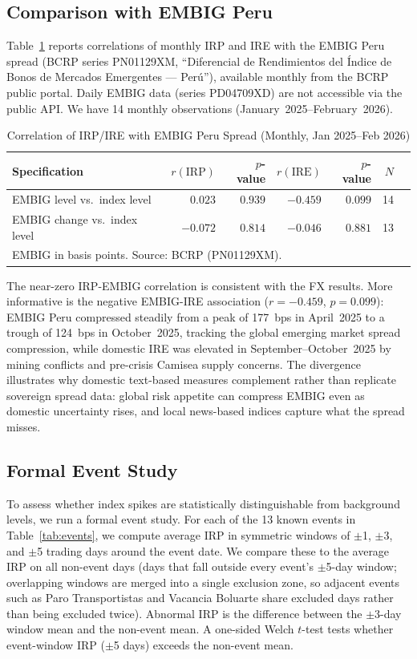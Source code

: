 \documentclass[12pt,a4paper]{article}
\begin{document}
\subsection{Comparison with EMBIG Peru}
\label{subsec:embig}

Table~\ref{tab:embig} reports correlations of monthly IRP and IRE with the
EMBIG Peru spread (BCRP series PN01129XM, ``Diferencial de Rendimientos del
\'Indice de Bonos de Mercados Emergentes --- Per\'u''), available monthly
from the BCRP public portal.  Daily EMBIG data (series PD04709XD) are
not accessible via the public API.  We have 14 monthly observations
(January~2025--February~2026).

\begin{table}[h!]
\centering
\caption{Correlation of IRP/IRE with EMBIG Peru Spread (Monthly, Jan 2025--Feb 2026)}
\label{tab:embig}
\small
\begin{tabular}{lrrrrrr}
\toprule
Specification & $r(\text{IRP})$ & $p$-value & $r(\text{IRE})$ & $p$-value & $N$ \\
\midrule
EMBIG level vs.\ index level & $0.023$ & $0.939$ & $-0.459$ & $0.099$ & 14 \\
EMBIG change vs.\ index level & $-0.072$ & $0.814$ & $-0.046$ & $0.881$ & 13 \\
\bottomrule
\multicolumn{6}{l}{\footnotesize EMBIG in basis points. Source: BCRP (PN01129XM).}
\end{tabular}
\end{table}

The near-zero IRP-EMBIG correlation is consistent with the FX results.
More informative is the negative EMBIG-IRE association ($r = -0.459$,
$p = 0.099$): EMBIG Peru compressed steadily from a peak of 177~bps in
April~2025 to a trough of 124~bps in October~2025, tracking the global
emerging market spread compression, while domestic IRE was elevated in
September--October~2025 by mining conflicts and pre-crisis Camisea
supply concerns.  The divergence illustrates why domestic text-based
measures complement rather than replicate sovereign spread data: global
risk appetite can compress EMBIG even as domestic uncertainty rises,
and local news-based indices capture what the spread misses.

\subsection{Formal Event Study}
\label{subsec:event_study}

To assess whether index spikes are statistically distinguishable from
background levels, we run a formal event study.  For each of the 13 known
events in Table~\ref{tab:events}, we compute average IRP in symmetric
windows of $\pm$1, $\pm$3, and $\pm$5 trading days around the event date.
We compare these to the average IRP on all non-event days (days that fall
outside every event's $\pm$5-day window; overlapping windows are merged
into a single exclusion zone, so adjacent events such as Paro Transportistas
and Vacancia Boluarte share excluded days rather than being excluded twice).
Abnormal IRP is the difference between the $\pm$3-day window mean and the
non-event mean.  A one-sided Welch $t$-test tests whether event-window IRP
($\pm$5 days) exceeds the non-event mean.
\end{document}
